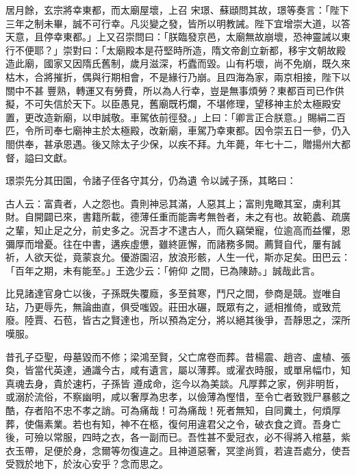 \begin{pinyinscope}
 居月餘，玄宗將幸東都，而太廟屋壞，上召
 宋璟、蘇頲問其故，璟等奏言：「陛下三年之制未畢，誠不可行幸。凡災變之發，皆所以明教誡。陛下宜增崇大道，以答天意，且停幸東都。」上又召崇問曰：「朕臨發京邑，太廟無故崩壞，恐神靈誡以東行不便耶？」崇對曰：「太廟殿本是苻堅時所造，隋文帝創立新都，移宇文朝故殿造此廟，國家又因隋氏舊制，歲月滋深，朽蠹而毀。山有朽壞，尚不免崩，既久來枯木，合將摧折，偶與行期相會，不是緣行乃崩。且四海為家，兩京相接，陛下以關中不甚
 豐熟，轉運又有勞費，所以為人行幸，豈是無事煩勞？東都百司已作供擬，不可失信於天下。以臣愚見，舊廟既朽爛，不堪修理，望移神主於太極殿安置，更改造新廟，以申誠敬。車駕依前徑發。」上曰：「卿言正合朕意。」賜絹二百匹，令所司奉七廟神主於太極殿，改新廟，車駕乃幸東都。因令崇五日一參，仍入閤供奉，甚承恩遇。後又除太子少保，以疾不拜。九年薨，年七十二，贈揚州大都督，謚曰文獻。



 璟崇先分其田園，令諸子侄各守其分，仍為遺
 令以誡子孫，其略曰：



 古人云：富貴者，人之怨也。貴則神忌其滿，人惡其上；富則鬼瞰其室，虜利其財。自開闢已來，書籍所載，德薄任重而能壽考無咎者，未之有也。故範蠡、疏廣之輩，知止足之分，前史多之。況吾才不逮古人，而久竊榮寵，位逾高而益懼，恩彌厚而增憂。往在中書，遘疾虛憊，雖終匪懈，而諸務多闕。薦賢自代，屢有誠祈，人欲天從，竟蒙哀允。優游園沼，放浪形骸，人生一代，斯亦足矣。田巴云：「百年之期，未有能至。」王逸少云：「俯仰
 之間，已為陳跡。」誠哉此言。



 比見諸達官身亡以後，子孫既失覆廕，多至貧寒，鬥尺之間，參商是競。豈唯自玷，乃更辱先，無論曲直，俱受嗤毀。莊田水碾，既眾有之，遞相推倚，或致荒廢。陸賈、石苞，皆古之賢達也，所以預為定分，將以絕其後爭，吾靜思之，深所嘆服。



 昔孔子亞聖，母墓毀而不修；梁鴻至賢，父亡席卷而葬。昔楊震、趙咨、盧植、張奐，皆當代英達，通識今古，咸有遺言，屬以薄葬。或濯衣時服，或單帛幅巾，知真魂去身，貴於速朽，子孫皆
 遵成命，迄今以為美談。凡厚葬之家，例非明哲，或溺於流俗，不察幽明，咸以奢厚為忠孝，以儉薄為慳惜，至令亡者致戮尸暴骸之酷，存者陷不忠不孝之誚。可為痛哉！可為痛哉！死者無知，自同糞土，何煩厚葬，使傷素業。若也有知，神不在柩，復何用違君父之令，破衣食之資。吾身亡後，可殮以常服，四時之衣，各一副而已。吾性甚不愛冠衣，必不得將入棺墓，紫衣玉帶，足便於身，念爾等勿復違之。且神道惡奢，冥塗尚質，若違吾處分，使吾
 受戮於地下，於汝心安乎？念而思之。




\end{pinyinscope}
